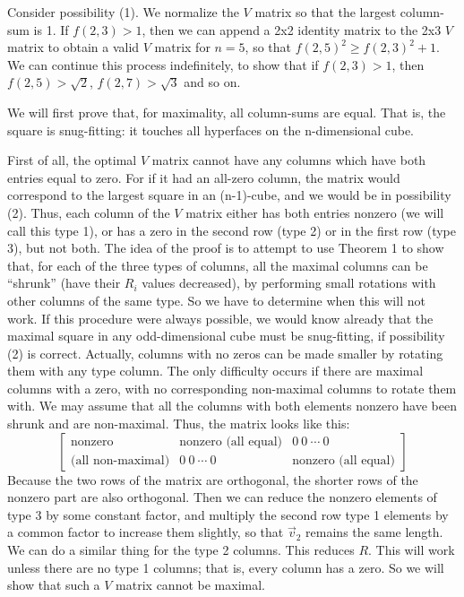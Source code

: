 Consider possibility (1).  We normalize the $V$ matrix so that the largest
column-sum is 1.  If $f(2,3) > 1$, then we can append a 2x2 identity matrix to
the 2x3 $V$ matrix to obtain a valid $V$ matrix for $n = 5$, so that $f(2,5)^2
\geq f(2,3)^2 + 1$.  We can continue this process indefinitely, to show that
if $f(2,3) > 1$, then $f(2,5) > \sqrt{2}$, $f(2,7) > \sqrt{3}$ and so on.

We will first prove that, for maximality, all column-sums are equal.  That is,
the square is snug-fitting:  it touches all hyperfaces on the n-dimensional
cube.

First of all, the optimal $V$ matrix cannot have any columns which have both
entries equal to zero.  For if it had an all-zero column, the matrix would
correspond to the largest square in an (n-1)-cube, and we would be in
possibility (2).  Thus, each column of the $V$ matrix either has both entries
nonzero (we will call this type 1), or has a zero in the second row (type 2)
or in the first row (type 3), but not both.  The idea of the proof is to
attempt to use Theorem 1 to show that, for each of the three types of columns,
all the maximal columns can be ``shrunk'' (have their $R_i$ values decreased),
by performing small rotations with other columns of the same type.  So we have
to determine when this will not work.  If this procedure were always possible,
we would know already that the maximal square in any odd-dimensional cube must
be snug-fitting, if possibility (2) is correct.  Actually, columns with no
zeros can be made smaller by rotating them with any type column.  The only
difficulty occurs if there are maximal columns with a zero, with no
corresponding non-maximal columns to rotate them with.  We may assume that all
the columns with both elements nonzero have been shrunk and are non-maximal.
Thus, the matrix looks like this:
\begin{equation*}
\left[
\begin{array}{c|c|c}

\text{nonzero}             &
\text{nonzero (all equal)} &
0~0~\cdots~0               \\

\text{(all non-maximal)}   &
0~0~\cdots~0               &
\text{nonzero (all equal)}

\end{array}
\right]
\end{equation*}
Because the two rows of the matrix are orthogonal, the shorter rows of the
nonzero part are also orthogonal.  Then we can reduce the nonzero elements of
type 3 by some constant factor, and multiply the second row type 1 elements
by a common factor to increase them slightly, so that $\vec{v}_2$ remains the
same length.  We can do a similar thing for the type 2 columns.  This reduces
$R$.  This will work unless there are no type 1 columns; that is, every column
has a zero.  So we will show that such a $V$ matrix cannot be maximal.

